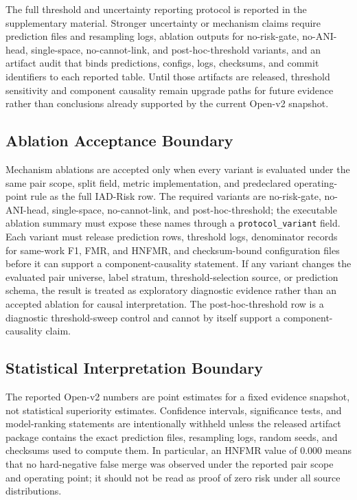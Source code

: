 \documentclass[preprint,12pt]{elsarticle}
\begin{document}
The full threshold and uncertainty reporting protocol is reported in the supplementary material. Stronger uncertainty or mechanism claims require prediction files and resampling logs, ablation outputs for no-risk-gate, no-ANI-head, single-space, no-cannot-link, and post-hoc-threshold variants, and an artifact audit that binds predictions, configs, logs, checksums, and commit identifiers to each reported table. Until those artifacts are released, threshold sensitivity and component causality remain upgrade paths for future evidence rather than conclusions already supported by the current Open-v2 snapshot.

\subsection{Ablation Acceptance Boundary}

Mechanism ablations are accepted only when every variant is evaluated under the same pair scope, split field, metric implementation, and predeclared operating-point rule as the full IAD-Risk row. The required variants are no-risk-gate, no-ANI-head, single-space, no-cannot-link, and post-hoc-threshold; the executable ablation summary must expose these names through a \texttt{protocol\_variant} field. Each variant must release prediction rows, threshold logs, denominator records for same-work F1, FMR, and HNFMR, and checksum-bound configuration files before it can support a component-causality statement. If any variant changes the evaluated pair universe, label stratum, threshold-selection source, or prediction schema, the result is treated as exploratory diagnostic evidence rather than an accepted ablation for causal interpretation. The post-hoc-threshold row is a diagnostic threshold-sweep control and cannot by itself support a component-causality claim.

\subsection{Statistical Interpretation Boundary}

The reported Open-v2 numbers are point estimates for a fixed evidence snapshot, not statistical superiority estimates. Confidence intervals, significance tests, and model-ranking statements are intentionally withheld unless the released artifact package contains the exact prediction files, resampling logs, random seeds, and checksums used to compute them. In particular, an HNFMR value of 0.000 means that no hard-negative false merge was observed under the reported pair scope and operating point; it should not be read as proof of zero risk under all source distributions.
\end{document}
